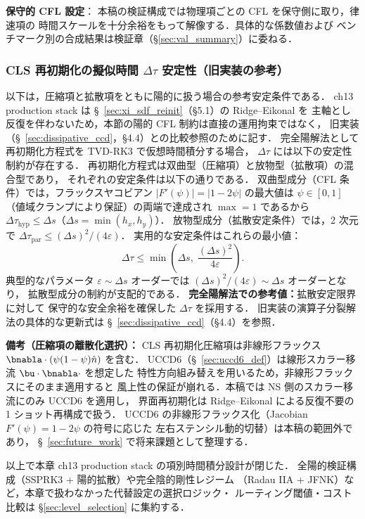 \textbf{保守的 CFL 設定}：
本稿の検証構成では物理項ごとの CFL を保守側に取り，律速項の
時間スケールを十分余裕をもって解像する．具体的な係数値および
ベンチマーク別の合成結果は検証章（§\ref{sec:val_summary}）に委ねる．

\subsubsection{CLS 再初期化の擬似時間 \texorpdfstring{$\Delta\tau$}{Δτ} 安定性（旧実装の参考）}
\label{warn:cls_dtau_stability_v7}
\label{warn:cls_dtau_stability}%
以下は，圧縮項と拡散項をともに陽的に扱う場合の参考安定条件である．
ch13 production stack は \S~\ref{sec:xi_sdf_reinit}（§5.1）の Ridge--Eikonal を
主軸とし反復を伴わないため，本節の陽的 CFL 制約は直接の運用拘束ではなく，
旧実装（\S~\ref{sec:dissipative_ccd}，§4.4）との比較参照のために記す．
完全陽解法として再初期化方程式を TVD-RK3 で仮想時間積分する場合，
$\Delta\tau$ には以下の安定性制約が存在する．
再初期化方程式は双曲型（圧縮項）と放物型（拡散項）の混合型であり，
それぞれの安定条件は以下の通りである．
双曲型成分（CFL 条件）では，フラックスヤコビアン $|F'(\psi)| = |1-2\psi|$ の最大値は
$\psi \in [0,1]$（値域クランプにより保証）の両端で達成され $\max = 1$ であるから
$\Delta\tau_{\text{hyp}} \le \Delta s$（$\Delta s = \min(h_x, h_y)$）．
放物型成分（拡散安定条件）では，2 次元で
$\Delta\tau_{\text{par}} \le (\Delta s)^2/(4\varepsilon)$．
実用的な安定条件はこれらの最小値：
\[
  \Delta\tau \le \min\!\left(\Delta s,\; \frac{(\Delta s)^2}{4\varepsilon}\right).
\]
典型的なパラメータ $\varepsilon \sim \Delta s$ オーダーでは
$(\Delta s)^2/(4\varepsilon) \sim \Delta s$ オーダーとなり，
拡散型成分の制約が支配的である．
\textbf{完全陽解法での参考値：}拡散安定限界に対して
保守的な安全余裕を確保した $\Delta\tau$ を採用する．
旧実装の演算子分裂解法の具体的な更新式は \S~\ref{sec:dissipative_ccd}（§4.4）を参照．

\textbf{備考（圧縮項の離散化選択）：}
CLS 再初期化圧縮項は非線形フラックス $\bnabla\cdot(\psi(1-\psi)\hat{n})$ を含む．
UCCD6（\S~\ref{sec:uccd6_def}）は線形スカラー移流 $\bu\cdot\bnabla\cdot$ を想定した
特性方向組み替えを用いるため，非線形フラックスにそのまま適用すると
風上性の保証が崩れる．本稿では NS 側のスカラー移流にのみ UCCD6 を適用し，
界面再初期化は Ridge--Eikonal による反復不要の 1 ショット再構成で扱う．
UCCD6 の非線形フラックス化（Jacobian $F'(\psi) = 1-2\psi$ の符号に応じた
左右ステンシル動的切替）は本稿の範囲外であり，
\S~\ref{sec:future_work} で将来課題として整理する．

以上で本章 ch13 production stack の項別時間積分設計が閉じた．
全陽的検証構成（SSPRK3 + 陽的拡散）や完全陰的剛性レジーム
（Radau IIA + JFNK）など，本章で扱わなかった代替設定の選択ロジック・
ルーティング閾値・コスト比較は §\ref{sec:level_selection} に集約する．
